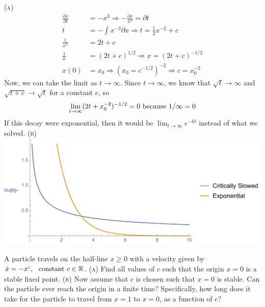 \documentclass[11pt,answers]{exam}
\begin{document}
\begin{questions}
\begin{solution}
\newline\textsc{(a)}
\begin{align*}
    \frac{\partial{x}}{\partial{t}} &= -x^3 \Rightarrow -\frac{\partial{x}}{x^3} = \partial{t} \\
    t &= -\int x^{-3}\partial{x} \Rightarrow t = \frac{1}{2}x^{-2} + c \\
    \frac{1}{x^2} &= 2t + c \\
    \frac{1}{x} &= (2t + c)^{1/2} \Rightarrow x = (2t + c)^{-1/2} \\
    x(0) &= x_0 \Rightarrow (x_0 = c^{-1/2})^{-2} \Rightarrow c = x_0^{-2}
\end{align*}
Now, we can take the limit as $t \to \infty$.  Since $t \to \infty$, we know that $\sqrt{t} \to \infty$ and $\sqrt{t + c} \to \sqrt{t}$ for a constant $c$, so 
\[
\lim_{t\to\infty} (2t + x_0^{-2})^{-1/2} = 0 \hbox{ because 1/$\infty = 0$}
\]
If this decay were exponential, then it would be $\lim_{t\to\infty} e^{-kt}$ instead of what we solved.
\newline\newline\textsc{(b)}
\newline\includegraphics[width = \textwidth]{plot}
\end{solution}

\item A particle travels on the half-line $x \geq 0$ with a velocity given by $\dot{x} = -x^c, ~ \hbox{ constant } c \in \mathbb{R}$.
\newline\textsc{(a)} Find all values of $c$ such that the origin $x = 0$ is a stable fixed point. 
\newline\textsc{(b)} Now assume that $c$ is chosen such that $x = 0$ is stable. Can the particle ever reach the origin in a
finite time? Specifically, how long does it take for the particle to travel from $x = 1$ to $x = 0$, as a
function of $c$?


\end{questions}
\end{document}
